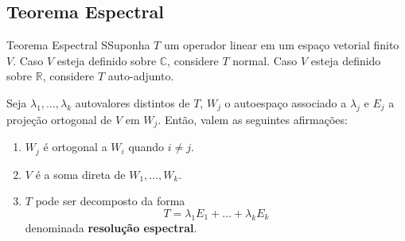 \documentclass[12pt,a4paper]{article}
\begin{document}
\subsection{Teorema Espectral}

\begin{teorema}{Teorema Espectral}
SSuponha $T$ um operador linear em um espaço vetorial finito $V$. Caso $V$ esteja definido sobre $\mathbb{C}$, considere $T$ normal. Caso $V$ esteja definido sobre $\mathbb{R}$, considere $T$ auto-adjunto.

Seja $\lambda_1, \ldots, \lambda_k$ autovalores distintos de $T$, $W_j$ o autoespaço associado a $\lambda_j$ e $E_j$ a projeção ortogonal de $V$ em $W_j$. Então, valem as seguintes afirmações:
\begin{enumerate}
\item $W_j$ é ortogonal a $W_i$ quando $i \neq j$.
\item $V$ é a soma direta de $W_1, \ldots, W_k$.
\item $T$ pode ser decomposto da forma \[T = \lambda_1 E_1 + \ldots + \lambda_k E_k\] denominada \textbf{resolução espectral}.
\end{enumerate}
\end{teorema}

\nocite{*}


\end{document}
